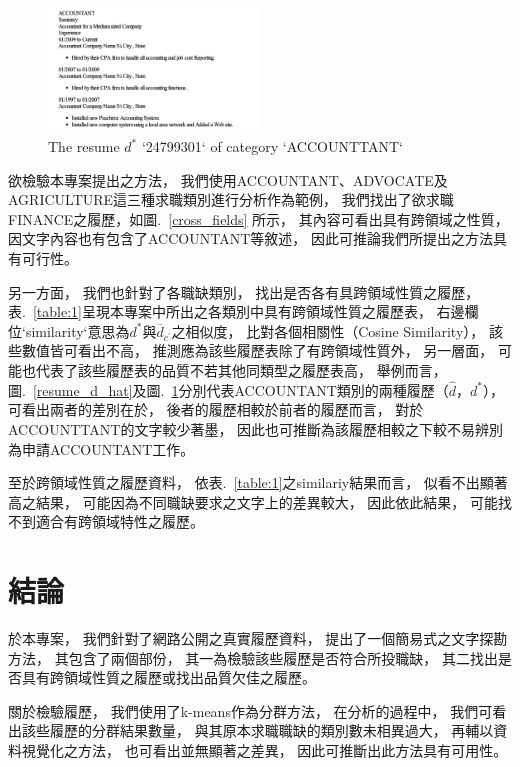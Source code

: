 \documentclass[acmsmall]{acmart}
\begin{document}
\begin{figure}[t]
    \centerline{\includegraphics[width=0.5\textwidth]{resume_d_star.png}}
    \caption{The resume $d^{*}$ `24799301` of category `ACCOUNTTANT`}
    \label{resume_d_star}
\end{figure}

欲檢驗本專案提出之方法，
我們使用ACCOUNTANT、ADVOCATE及AGRICULTURE這三種求職類別進行分析作為範例，
我們找出了欲求職FINANCE之履歷，如圖.~\ref{cross_fields} 所示，
其內容可看出具有跨領域之性質，
因文字內容也有包含了ACCOUNTANT等敘述，
因此可推論我們所提出之方法具有可行性。

另一方面，
我們也針對了各職缺類別，
找出是否各有具跨領域性質之履歷，
表.~\ref{table:1}呈現本專案中所出之各類別中具有跨領域性質之履歷表，
右邊欄位`similarity`意思為$d^{*}$與$\overline{d}_{c^{'}}$之相似度，
比對各個相關性（Cosine Similarity），
該些數值皆可看出不高，
推測應為該些履歷表除了有跨領域性質外，
另一層面，
可能也代表了該些履歷表的品質不若其他同類型之履歷表高，
舉例而言，
圖.~\ref{resume_d_hat}及圖.~\ref{resume_d_star}分別代表ACCOUNTANT類別的兩種履歷（$\hat{d}$，$d^{*}$），
可看出兩者的差別在於，
後者的履歷相較於前者的履歷而言，
對於ACCOUNTTANT的文字較少著墨，
因此也可推斷為該履歷相較之下較不易辨別為申請ACCOUNTANT工作。

至於跨領域性質之履歷資料，
依表.~\ref{table:1}之similariy結果而言，
似看不出顯著高之結果，
可能因為不同職缺要求之文字上的差異較大，
因此依此結果，
可能找不到適合有跨領域特性之履歷。

\section{結論}

於本專案，
我們針對了網路公開之真實履歷資料，
提出了一個簡易式之文字探勘方法，
其包含了兩個部份，
其一為檢驗該些履歷是否符合所投職缺，
其二找出是否具有跨領域性質之履歷或找出品質欠佳之履歷。

關於檢驗履歷，
我們使用了k-means作為分群方法，
在分析的過程中，
我們可看出該些履歷的分群結果數量，
與其原本求職職缺的類別數未相異過大，
再輔以資料視覺化之方法，
也可看出並無顯著之差異，
因此可推斷出此方法具有可用性。
\end{document}
